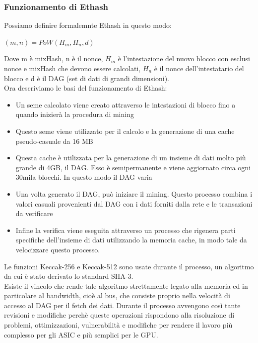 \documentclass[a4paper,11pt]{report}
\begin{document}
\subsubsection{Funzionamento di Ethash}
Possiamo definire formalemnte Ethash in questo modo:\\
\begin{center}
$ (m,n) = PoW(\textit{H}_{m},\textit{H}_{n},d) $
\end{center}
Dove m è mixHash, n è il nonce, $H_{m}$ è l'intestazione del nuovo blocco con esclusi nonce e mixHash che devono essere calcolati, $H_{n}$ è il nonce dell'intestatario del blocco e d è il DAG (set di dati di grandi dimensioni).\\
Ora descriviamo le basi del funzionamento di Ethash:
\begin{itemize}
\item Un seme calcolato viene creato attraverso le intestazioni di blocco fino a quando inizierà la procedura di mining
\item  Questo seme viene utilizzato per il calcolo e la generazione di una cache pseudo-casuale da 16 MB
\item Questa cache è utilizzata per la generazione di un insieme di dati molto più grande di 4GB, il DAG. Esso è semipermanente e viene aggiornato circa ogni 30mila blocchi. In questo modo il DAG varia
\item Una volta generato il DAG, può iniziare il mining. Questo processo combina i valori casuali provenienti dal DAG con i dati forniti dalla rete e le transazioni da verificare
\item Infine la verifica viene eseguita attraverso un processo che rigenera parti specifiche dell'insieme di dati utilizzando la memoria cache, in modo tale da velocizzare questo processo.\\
\end{itemize}
Le funzioni Keccak-256 e Keccak-512 sono usate durante il processo, un algoritmo da cui è stato derivato lo standard SHA-3.\\
Esiste il vincolo che rende tale algoritmo strettamente legato alla memoria ed in particolare al bandwidth, cioè al bus, che consiste proprio nella velocità di accesso al DAG per il fetch dei dati.
Durante il processo avvengono così tante revisioni e modifiche perchè queste operazioni rispondono alla risoluzione di problemi, ottimizzazioni, vulnerabilità e modifiche per rendere il lavoro più complesso per gli ASIC e più semplici per le GPU.\\
\end{document}
